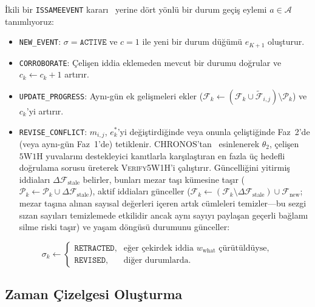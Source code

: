 ﻿\documentclass[journal]{IEEEtran}
\begin{document}
\.{I}kili bir \texttt{ISSAMEEVENT} karar{\i}~\cite{hu2024moments} yerine d\"{o}rt y\"{o}nl\"{u} bir durum ge\c{c}i\c{s} eylemi $a \in \mathcal{A}$ tan{\i}ml{\i}yoruz:
\begin{itemize}
    \item \texttt{NEW\_EVENT}: $\sigma = \texttt{ACTIVE}$ ve $c = 1$ ile yeni bir durum d\"{u}\u{g}\"{u}m\"{u} $e_{K+1}$ olu\c{s}turur.
    \item \texttt{CORROBORATE}: \c{C}eli\c{s}en iddia eklemeden mevcut bir durumu do\u{g}rular ve $c_k \leftarrow c_k + 1$ art{\i}r{\i}r.
    \item \texttt{UPDATE\_PROGRESS}: Ayn{\i}-g\"{u}n ek geli\c{s}meleri ekler ($\mathcal{F}_k \leftarrow (\mathcal{F}_k \cup \tilde{\mathcal{F}}_{i,j}) \setminus \mathcal{P}_k$) ve $c_k$'yi art{\i}r{\i}r.
    \item \texttt{REVISE\_CONFLICT}: $m_{i,j}$, $e_k^*$'yi de\u{g}i\c{s}tirdi\u{g}inde veya onunla \c{c}eli\c{s}ti\u{g}inde Faz~2'de (veya ayn{\i}-g\"{u}n Faz~1'de) tetiklenir. CHRONOS'tan~\cite{wu2025unfolding} esinlenerek $\theta_2$, \c{c}eli\c{s}en $5\text{W}1\text{H}$ yuvalar{\i}n{\i} destekleyici kan{\i}tlarla kar\c{s}{\i}la\c{s}t{\i}ran en fazla \"{u}\c{c} hedefli do\u{g}rulama sorusu \"{u}reterek \textsc{Verify5W1H}'i \c{c}al{\i}\c{s}t{\i}r{\i}r. G\"{u}ncelli\u{g}ini yitirmi\c{s} iddialar{\i} $\Delta\mathcal{F}_{\text{stale}}$ belirler, bunlar{\i} mezar ta\c{s}{\i} k\"{u}mesine ta\c{s}{\i}r ($\mathcal{P}_k \leftarrow \mathcal{P}_k \cup \Delta\mathcal{F}_{\text{stale}}$), aktif iddialar{\i} g\"{u}nceller ($\mathcal{F}_k \leftarrow (\mathcal{F}_k \setminus \Delta\mathcal{F}_{\text{stale}}) \cup \mathcal{F}_{\text{new}}$; mezar ta\c{s}{\i}na al{\i}nan say{\i}sal de\u{g}erleri i\c{c}eren art{\i}k c\"{u}mleleri temizler---bu sezgi s{\i}zan say{\i}lar{\i} temizlemede etkilidir ancak ayn{\i} say{\i}y{\i} payla\c{s}an ge\c{c}erli ba\u{g}lam{\i} silme riski ta\c{s}{\i}r) ve ya\c{s}am d\"{o}ng\"{u}s\"{u} durumunu g\"{u}nceller:
\end{itemize}
\begin{equation}
\sigma_k \leftarrow \begin{cases}
\texttt{RETRACTED}, & \text{e\u{g}er \c{c}ekirdek iddia } w_{\text{what}} \text{ \c{c}\"{u}r\"{u}t\"{u}ld\"{u}yse}, \\
\texttt{REVISED}, & \text{di\u{g}er durumlarda}.
\end{cases}
\label{eq:status_update}
\end{equation}

\subsection{Zaman \c{C}izelgesi Olu\c{s}turma}
\label{subsec:timeline_construction}
\end{document}
